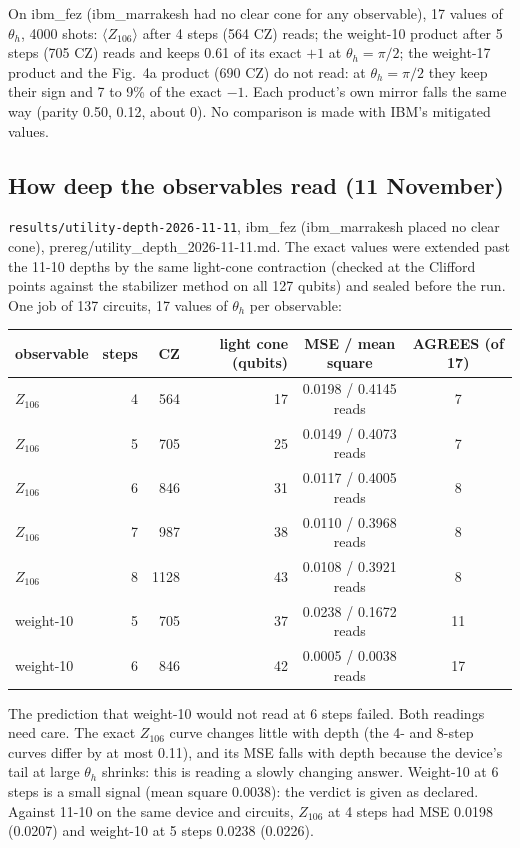 \documentclass[10pt,a4paper]{article}
\begin{document}
On ibm\_fez (ibm\_marrakesh had no clear cone for any observable), 17 values of $\theta_h$, 4000 shots:
$\langle Z_{106}\rangle$ after 4 steps (564 CZ) reads; the weight-10 product after 5 steps (705 CZ) reads and keeps 0.61
of its exact $+1$ at $\theta_h = \pi/2$; the weight-17 product and the Fig.~4a product (690 CZ) do not read: at
$\theta_h = \pi/2$ they keep their sign and 7 to 9\% of the exact $-1$. Each product's own mirror falls the same way
(parity 0.50, 0.12, about 0). No comparison is made with IBM's mitigated values.

\subsection{How deep the observables read (11 November)}\label{sec:utility-depth}
\texttt{results/utility-depth-2026-11-11}, ibm\_fez (ibm\_marrakesh placed no clear cone),
prereg/utility\_depth\_2026-11-11.md. The exact values were extended past the 11-10 depths by the same light-cone
contraction (checked at the Clifford points against the stabilizer method on all 127 qubits) and sealed before the
run. One job of 137 circuits, 17 values of $\theta_h$ per observable:

\begin{center}\small
\begin{tabular}{lrrrcc}
\toprule
observable & steps & CZ & light cone (qubits) & MSE / mean square & AGREES (of 17) \\
\midrule
$Z_{106}$ & 4 & 564 & 17 & 0.0198 / 0.4145 reads & 7 \\
$Z_{106}$ & 5 & 705 & 25 & 0.0149 / 0.4073 reads & 7 \\
$Z_{106}$ & 6 & 846 & 31 & 0.0117 / 0.4005 reads & 8 \\
$Z_{106}$ & 7 & 987 & 38 & 0.0110 / 0.3968 reads & 8 \\
$Z_{106}$ & 8 & 1128 & 43 & 0.0108 / 0.3921 reads & 8 \\
weight-10 & 5 & 705 & 37 & 0.0238 / 0.1672 reads & 11 \\
weight-10 & 6 & 846 & 42 & 0.0005 / 0.0038 reads & 17 \\
\bottomrule
\end{tabular}
\end{center}

The prediction that weight-10 would not read at 6 steps failed. Both readings need care. The exact $Z_{106}$ curve
changes little with depth (the 4- and 8-step curves differ by at most 0.11), and its MSE falls with depth because the
device's tail at large $\theta_h$ shrinks: this is reading a slowly changing answer. Weight-10 at 6 steps is a small
signal (mean square 0.0038): the verdict is given as declared. Against 11-10 on the same device and circuits,
$Z_{106}$ at 4 steps had MSE 0.0198 (0.0207) and weight-10 at 5 steps 0.0238 (0.0226).
\end{document}
